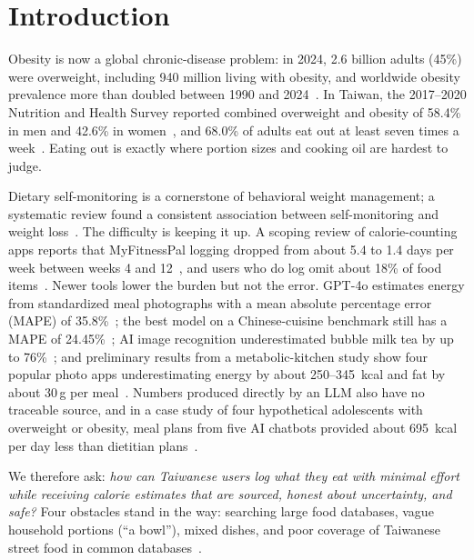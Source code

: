 \documentclass[conference]{IEEEtran}
\begin{document}
\section{Introduction}

Obesity is now a global chronic-disease problem: in 2024, 2.6 billion adults (45\%) were overweight, including 940 million living with obesity, and worldwide obesity prevalence more than doubled between 1990 and 2024~\cite{who_fact}. In Taiwan, the 2017--2020 Nutrition and Health Survey reported combined overweight and obesity of 58.4\% in men and 42.6\% in women~\cite{hpa_prev}, and 68.0\% of adults eat out at least seven times a week~\cite{nahsit_report}. Eating out is exactly where portion sizes and cooking oil are hardest to judge.

Dietary self-monitoring is a cornerstone of behavioral weight management; a systematic review found a consistent association between self-monitoring and weight loss~\cite{burke2011}. The difficulty is keeping it up. A scoping review of calorie-counting apps reports that MyFitnessPal logging dropped from about 5.4 to 1.4 days per week between weeks 4 and 12~\cite{dugas2026}, and users who do log omit about 18\% of food items~\cite{chen2019}. Newer tools lower the burden but not the error. GPT-4o estimates energy from standardized meal photographs with a mean absolute percentage error (MAPE) of 35.8\%~\cite{fridolfsson2025}; the best model on a Chinese-cuisine benchmark still has a MAPE of 24.45\%~\cite{jin2026}; AI image recognition underestimated bubble milk tea by up to 76\%~\cite{li2024}; and preliminary results from a metabolic-kitchen study show four popular photo apps underestimating energy by about 250--345~kcal and fat by about 30\,g per meal~\cite{hengist2026}. Numbers produced directly by an LLM also have no traceable source, and in a case study of four hypothetical adolescents with overweight or obesity, meal plans from five AI chatbots provided about 695~kcal per day less than dietitian plans~\cite{bilen2026}.

We therefore ask: \emph{how can Taiwanese users log what they eat with minimal effort while receiving calorie estimates that are sourced, honest about uncertainty, and safe?} Four obstacles stand in the way: searching large food databases, vague household portions (``a bowl''), mixed dishes, and poor coverage of Taiwanese street food in common databases~\cite{tfda_db,usda_fdc}.
\end{document}
